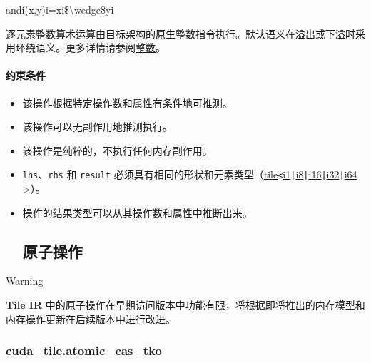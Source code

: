 \documentclass{article}
\begin{document}
andi(x,y)i=xi\$\textbackslash{}wedge\$yi


逐元素整数算术运算由目标架构的原生整数指令执行。默认语义在溢出或下溢时采用环绕语义。更多详情请参阅\href{https://docs.nvidia.com/cuda/tile-ir/latest/sections/operations.html#op-group-integer}{整数}。





\paragraph{约束条件}


\begin{itemize}
\item 该操作根据特定操作数和属性有条件地可推测。
\item 该操作可以无副作用地推测执行。
\item 该操作是纯粹的，不执行任何内存副作用。
\item \texttt{lhs}、\texttt{rhs} 和 \texttt{result} 必须具有相同的形状和元素类型（\href{https://docs.nvidia.com/cuda/tile-ir/latest/sections/types.html#type-tile}{tile}\texttt{<}\href{https://docs.nvidia.com/cuda/tile-ir/latest/sections/types.html#subsection-element-types}{i1}\texttt{|}\href{https://docs.nvidia.com/cuda/tile-ir/latest/sections/types.html#subsection-element-types}{i8}\texttt{|}\href{https://docs.nvidia.com/cuda/tile-ir/latest/sections/types.html#subsection-element-types}{i16}\texttt{|}\href{https://docs.nvidia.com/cuda/tile-ir/latest/sections/types.html#subsection-element-types}{i32}\texttt{|}\href{https://docs.nvidia.com/cuda/tile-ir/latest/sections/types.html#subsection-element-types}{i64} >）。
\item 操作的结果类型可以从其操作数和属性中推断出来。






\subsection{原子操作}


\end{itemize}
Warning




\textbf{Tile IR} 中的原子操作在早期访问版本中功能有限，将根据即将推出的内存模型和内存操作更新在后续版本中进行改进。





\subsubsection{cuda\_tile.atomic\_cas\_tko}
\end{document}
